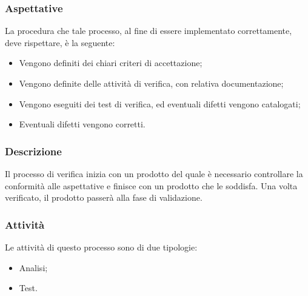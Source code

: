 \documentclass[../norme-di-progetto.tex]{subfiles}
\begin{document}
\subsubsection{Aspettative}
La procedura che tale processo, al fine di essere implementato correttamente, deve rispettare, è la seguente:
\begin{itemize}
  \item Vengono definiti dei chiari criteri di accettazione;
  \item Vengono definite delle attività di verifica, con relativa documentazione;
  \item Vengono eseguiti dei test di verifica, ed eventuali difetti vengono catalogati;
  \item Eventuali difetti vengono corretti.
\end{itemize}

\subsubsection{Descrizione}
Il processo di verifica inizia con un prodotto del quale è necessario controllare la conformità alle aspettative e finisce con un prodotto che le soddisfa. Una volta verificato, il prodotto passerà alla fase di validazione.

\subsubsection{Attività}
Le attività di questo processo sono di due tipologie:
\begin{itemize}
  \item Analisi;
  \item Test.
\end{itemize}
\end{document}
